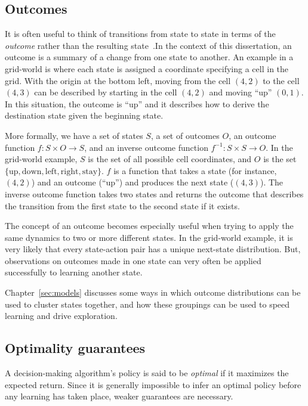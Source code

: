\subsection{Outcomes}

It is often useful to think of transitions from state to state in terms of the \emph{outcome} rather than the resulting state~\cite{jong07,leffler07}.In the context of this dissertation, an outcome is a summary of a change from one state to another. An example in a grid-world is where each state is assigned a coordinate specifying a cell in the grid. With the origin at the bottom left, moving from the cell $(4,2)$ to the cell $(4,3)$ can be described by starting in the cell $(4,2)$ and moving ``up'' $(0,1)$. In this situation, the outcome is ``up'' and it describes how to derive the destination state given the beginning state.

More formally, we have a set of states $S$, a set of outcomes $O$, an outcome function $f:S \times O \rightarrow S$, and an inverse outcome function $f^{-1}: S \times S \rightarrow O$. In the grid-world example, $S$ is the set of all possible cell coordinates, and $O$ is the set $\{\mbox{up},\mbox{down},\mbox{left},\mbox{right},\mbox{stay}\}$. $f$ is a function that takes a state (for instance, $(4,2)$) and an outcome (``up'') and produces the next state ($(4,3)$). The inverse outcome function takes two states and returns the outcome that describes the transition from the first state to the second state if it exists.

The concept of an outcome becomes especially useful when trying to apply the same dynamics to two or more different states. In the grid-world example, it is very likely that every state-action pair has a unique next-state distribution. But, observations on outcomes made in one state can very often be applied successfully to learning another state.

Chapter~\ref{sec:models} discusses some ways in which outcome distributions can be used to cluster states together, and how these groupings can be used to speed learning and drive exploration.

\subsection{Optimality guarantees}

A decision-making algorithm's policy is said to be \emph{optimal} if it maximizes the expected return. Since it is generally impossible to infer an optimal policy before any learning has taken place, weaker guarantees are necessary.

